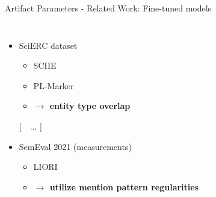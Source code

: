 \documentclass[en,16:9,smallfoot]{sdqbeamer}
\begin{document}
   \begin{frame}{Artifact Parameters - Related Work: Fine-tuned models}
   \begin{columns}
           \begin{itemize}
               \item SciERC dataset %
                   \begin{itemize}
                       \item SCIIE~\cite{luan2018scierc}
                       \item PL-Marker~\cite{Ye2022}
                       \item \textbf{$\rightarrow$ entity type overlap}
                   \end{itemize}
               \item [[~~...]]
               \item SemEval 2021 (measurements)
                   \begin{itemize}
                       \item LIORI~\cite{Davletov2021}
                       \item \textbf{$\rightarrow$ utilize mention pattern regularities}
                   \end{itemize}
           \end{itemize}

\end{columns}
\end{frame}
\end{document}
